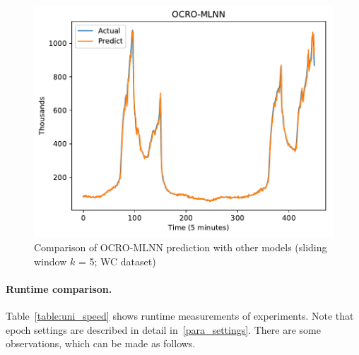 \documentclass[smallcondensed, natbib]{svjour3}     %
\begin{document}
{\begin{figure}[!ht]
\begin{minipage}[b]{0.33\linewidth}
    \includegraphics[width=0.9\linewidth]{images/pdf/predict/k5/wc_k5_ocro_mlnn.pdf} 
  \end{minipage} 
  \caption{Comparison of OCRO-MLNN prediction with other models (sliding window $k$ = 5; WC dataset)} 
  \label{predict_wc_sliding5} 
\end{figure}

\paragraph{\textbf{Runtime comparison.}} Table~\ref{table:uni_speed} shows runtime measurements of experiments. Note that epoch settings are described in detail in~\ref{para_settings}. There are some observations, which can be made as follows.

}
\end{document}
